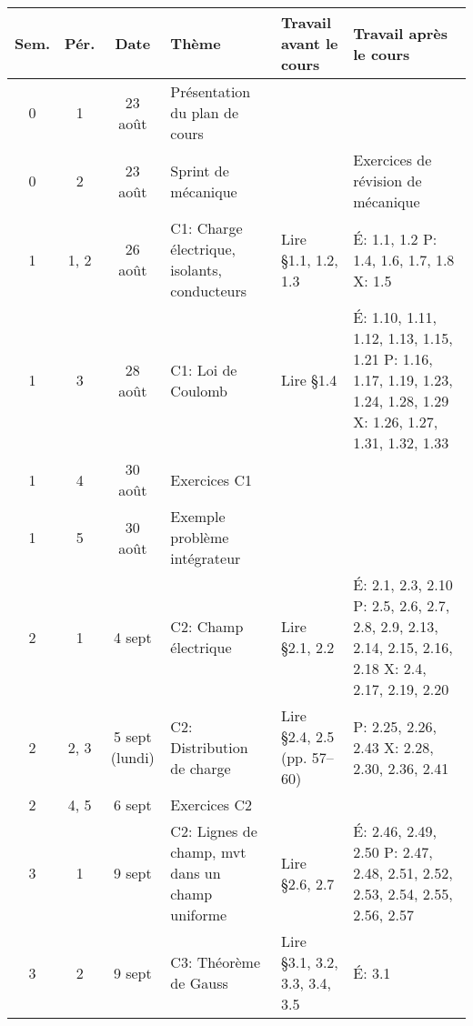 \documentclass[10pt]{article}
\begin{document}
\sffamily
\renewcommand{\arraystretch}{1.2}
\begin{longtable}{cccp{6cm}lp{9cm}}
  \toprule
  \textbf{Sem.}  &  \textbf{Pér.}  &  \textbf{Date}  &  \textbf{Thème}
    &  \textbf{Travail avant le cours}
    &  \textbf{Travail après le cours}  \\
  \midrule
  \endhead
  0     &  1     &  23 août  &  Présentation du plan de cours
    &  &  \\
  0     &  2     &  23 août  &  Sprint de mécanique
    &  &  Exercices de révision de mécanique  \\
  \midrule
  1     &  1, 2  &  26 août     &  C1: Charge électrique, isolants, conducteurs
    & Lire \S 1.1, 1.2, 1.3
    & É: 1.1, 1.2 \newline 
      P: 1.4, 1.6, 1.7, 1.8 \newline 
      X: 1.5  \\
  1     &  3     &  28 août     &  C1: Loi de Coulomb
    & Lire \S 1.4
    & É: 1.10, 1.11, 1.12, 1.13, 1.15, 1.21 \newline
      P: 1.16, 1.17, 1.19, 1.23, 1.24, 1.28, 1.29 \newline 
      X: 1.26, 1.27, 1.31, 1.32, 1.33 \\
  1     &  4     &  30 août  &  Exercices C1
    &   &    \\
  1     &  5     &  30 août   &  Exemple problème intégrateur
    &   &    \\
  \midrule
  2     &  1     &  4 sept          &  C2: Champ électrique
    &  Lire \S 2.1, 2.2
    &  É: 2.1, 2.3, 2.10 \newline 
       P: 2.5, 2.6, 2.7, 2.8, 2.9, 2.13, 2.14, 2.15, 2.16, 2.18  \newline
       X: 2.4, 2.17, 2.19, 2.20 \\
  2     &  2, 3     &  5 sept (lundi)  &  C2: Distribution de charge
    &  Lire \S 2.4, 2.5 (pp. 57--60)
    &  P: 2.25, 2.26, 2.43 \newline
       X: 2.28, 2.30, 2.36, 2.41 \\
  2     &  4, 5  &  6 sept          &  Exercices C2  \\
  \midrule
  3     &  1  &  9 sept    &  C2: Lignes de champ, mvt dans un champ uniforme
    & Lire \S 2.6, 2.7
    &  É: 2.46, 2.49, 2.50 \newline 
       P: 2.47, 2.48, 2.51, 2.52, 2.53, 2.54, 2.55, 2.56, 2.57 \\
  3     &  2  &  9 sept    &  C3: Théorème de Gauss
    & Lire \S 3.1, 3.2, 3.3, 3.4, 3.5 
    &  É: 3.1 \newline 

\end{longtable}
\end{document}
